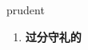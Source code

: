 
\begin{frame}
{\huge prudent}
\begin{center}
\begin{enumerate}\Large
  \item \textbf{过分守礼的}
\end{enumerate}
\end{center}
\end{frame}
